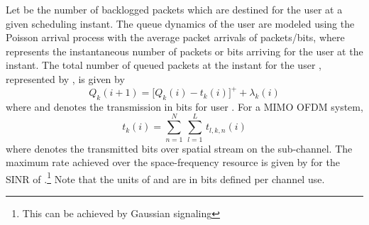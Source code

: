 Let  be the number of backlogged packets which are destined for the user  at a given scheduling instant. The queue dynamics of the user  are modeled using the Poisson arrival process with the average packet arrivals of  packets/bits, where  represents the instantaneous number of packets or bits arriving for the user  at the  instant. The total number of queued packets at the  instant for the user , represented by , is given by
\begin{equation}
Q_k(i+1) = \Big [ Q_k(i) - t_k(i) \Big ]^+ + \lambda_k(i)
\label{eqn-2a}
\end{equation}
where  and  denotes the transmission in bits for user . For a \ac{MIMO} \ac{OFDM} system,
\begin{equation}
t_k(i) = \sum_{n = 1}^N \, \sum_{l = 1}^L \, t_{l,k,n}(i)
\end{equation}
where  denotes the transmitted bits over  spatial stream on the  sub-channel. The maximum rate achieved over the  space-frequency resource is given by  for the \ac{SINR} of .\footnote{This can be achieved by Gaussian signaling} Note that the units of  and  are in bits defined per channel use. 